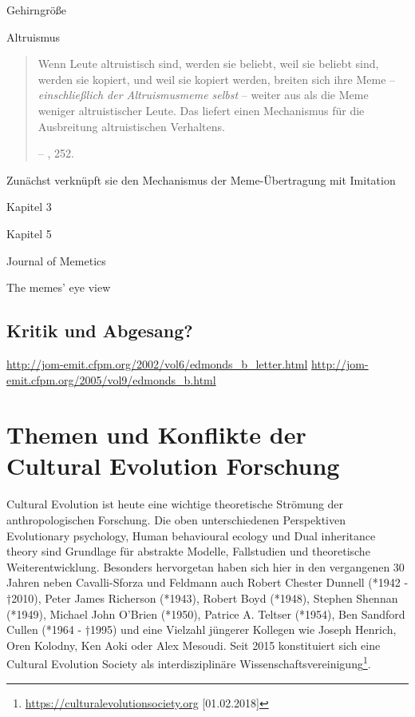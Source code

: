 \documentclass[openany,twoside,twocolumn]{book}
\let\rmarkdownfootnote\footnote%
\def\footnote{\protect\rmarkdownfootnote}
\begin{document}
Gehirngröße

Altruismus

\begin{quote}
Wenn Leute altruistisch sind, werden sie beliebt, weil sie beliebt sind,
werden sie kopiert, und weil sie kopiert werden, breiten sich ihre Meme
-- \emph{einschließlich der Altruismusmeme selbst} -- weiter aus als die
Meme weniger altruistischer Leute. Das liefert einen Mechanismus für die
Ausbreitung altruistischen Verhaltens.

-- \textcite{blackmore_macht_2000}, 252.
\end{quote}

Zunächst verknüpft sie den Mechanismus der Meme-Übertragung mit
Imitation

Kapitel 3

Kapitel 5

Journal of Memetics

The memes' eye view

\hypertarget{kritik-und-abgesang}{%
\subsection{Kritik und Abgesang?}\label{kritik-und-abgesang}}

\url{http://jom-emit.cfpm.org/2002/vol6/edmonds_b_letter.html}
\url{http://jom-emit.cfpm.org/2005/vol9/edmonds_b.html}

\hypertarget{themen-und-konflikte-der-cultural-evolution-forschung}{%
\section{Themen und Konflikte der Cultural Evolution
Forschung}\label{themen-und-konflikte-der-cultural-evolution-forschung}}

Cultural Evolution ist heute eine wichtige theoretische Strömung der
anthropologischen Forschung. Die oben unterschiedenen Perspektiven
Evolutionary psychology, Human behavioural ecology und Dual inheritance
theory sind Grundlage für abstrakte Modelle, Fallstudien und
theoretische Weiterentwicklung. Besonders hervorgetan haben sich hier in
den vergangenen 30 Jahren neben Cavalli-Sforza und Feldmann auch Robert
Chester Dunnell (*1942 - †2010), Peter James Richerson (*1943), Robert
Boyd (*1948), Stephen Shennan (*1949), Michael John O'Brien (*1950),
Patrice A. Teltser (*1954), Ben Sandford Cullen (*1964 - †1995) und eine
Vielzahl jüngerer Kollegen wie Joseph Henrich, Oren Kolodny, Ken Aoki
oder Alex Mesoudi. Seit 2015 konstituiert sich eine Cultural Evolution
Society als interdisziplinäre Wissenschaftsvereinigung\footnote{\url{https://culturalevolutionsociety.org}
  {[}01.02.2018{]}}.
\end{document}
